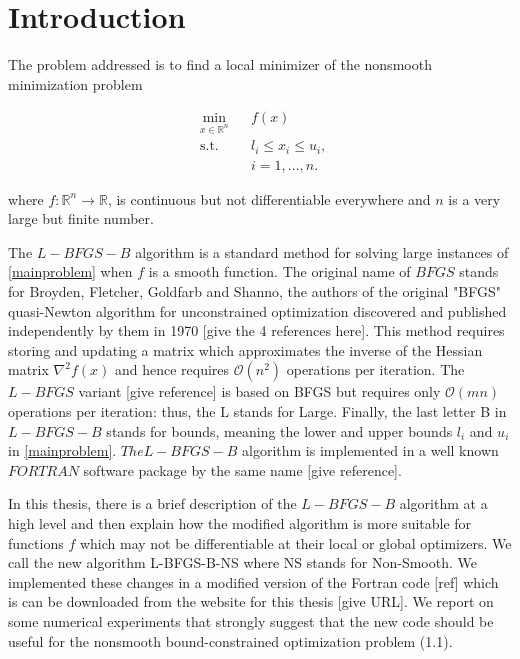 
\chapter{Introduction} %

\label{Chapter1} %


The problem addressed is to find a local minimizer of the nonsmooth minimization problem

\begin{equation} \label{mainproblem}
  \begin{aligned}
    & \underset{x \in \mathbb{R}^n}{\text{min}}
    & & f(x) \\
    & \text{s.t.}
    & & l_i \leq x_i \leq u_i , \; \\
    & & & i = 1, \ldots, n.
  \end{aligned}
\end{equation}

where $f \colon \mathbb{R}^n \to \mathbb{R}$, is continuous but not differentiable everywhere and $n$ is a very large but finite number.

The $L-BFGS-B$ algorithm \citep{lbfgsboriginal} is a standard method for solving large instances of \ref{mainproblem} when $f$ is a smooth function. The original name of $BFGS$ stands for Broyden, Fletcher, Goldfarb and Shanno, the authors
of the original "BFGS" quasi-Newton algorithm for unconstrained
optimization discovered and published
independently by them in 1970 [give the 4 references here].
This method requires storing and updating a matrix which 
approximates the inverse of the Hessian matrix $\nabla^2 f(x)$ and
hence requires $\mathcal{O}(n^2)$ operations per iteration.  
The $L-BFGS$ variant [give reference] is based on BFGS
but requires only $\mathcal{O}(mn)$ operations per iteration: thus,
the L stands for Large.  Finally, the last letter B in 
$L-BFGS-B$ stands for bounds, meaning the lower and upper
bounds $l_i$ and $u_i$ in \ref{mainproblem}.  $The L-BFGS-B$ algorithm
is implemented in a well known $FORTRAN$ software package
by the same name [give reference].

In this thesis, there is a brief description of the $L-BFGS-B$ algorithm
at a high level and then explain how the modified algorithm
is more suitable for functions $f$ which may not be
differentiable at their local or global optimizers.  
We call the new algorithm L-BFGS-B-NS where NS stands for
Non-Smooth.  We implemented these changes in a modified version 
of the Fortran code [ref] which is can be downloaded from the website
for this thesis [give URL].  We report on some numerical experiments 
that strongly suggest that the new code should be useful for the
nonsmooth bound-constrained optimization problem (1.1).

